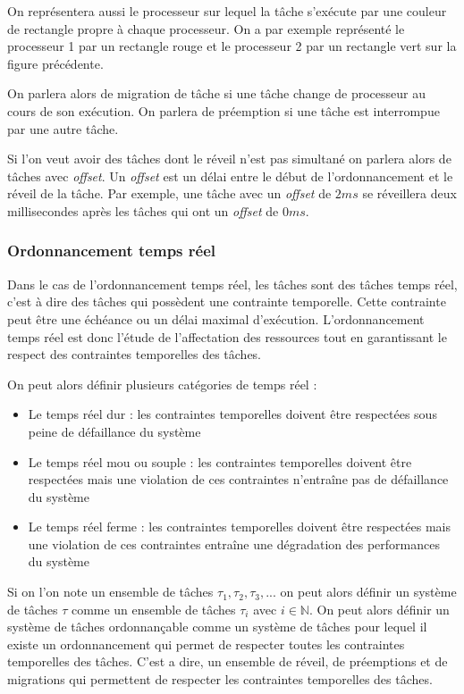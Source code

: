 On représentera aussi le processeur sur lequel la tâche s'exécute par une couleur de rectangle propre à chaque processeur. On a par exemple représenté le processeur 1 par un rectangle rouge et le processeur 2 par un rectangle vert sur la figure précédente.

On parlera alors de migration de tâche si une tâche change de processeur au cours de son exécution. On parlera de préemption si une tâche est interrompue par une autre tâche.


Si l'on veut avoir des tâches dont le réveil n'est pas simultané on parlera alors de tâches avec \textit{offset}. Un \textit{offset} est un délai entre le début de l'ordonnancement et le réveil de la tâche. Par exemple, une tâche avec un \textit{offset} de $2 ms$ se réveillera deux millisecondes après les tâches qui ont un \textit{offset} de $0 ms$.




\subsubsection{Ordonnancement temps réel}
Dans le cas de l'ordonnancement temps réel, les tâches sont des tâches temps réel, c'est à dire des tâches qui possèdent une contrainte temporelle. Cette contrainte peut être une échéance ou un délai maximal d'exécution. L'ordonnancement temps réel est donc l'étude de l'affectation des ressources tout en garantissant le respect des contraintes temporelles des tâches. 

On peut alors définir plusieurs catégories de temps réel :
\begin{itemize}
    \item Le temps réel dur : les contraintes temporelles doivent être respectées sous peine de défaillance du système
    \item Le temps réel mou ou souple : les contraintes temporelles doivent être respectées mais une violation de ces contraintes n'entraîne pas de défaillance du système
    \item Le temps réel ferme : les contraintes temporelles doivent être respectées mais une violation de ces contraintes entraîne une dégradation des performances du système
\end{itemize}


Si on l'on note un ensemble de tâches $\tau_1, \tau_2, \tau_3, ...$ on peut alors définir un système de tâches $\tau$ comme un ensemble de tâches $\tau_i$ avec $i \in \mathbb{N}$. On peut alors définir un système de tâches ordonnançable comme un système de tâches pour lequel il existe un ordonnancement qui permet de respecter toutes les contraintes temporelles des tâches. C'est a dire, un ensemble de réveil, de préemptions et de migrations qui permettent de respecter les contraintes temporelles des tâches.





